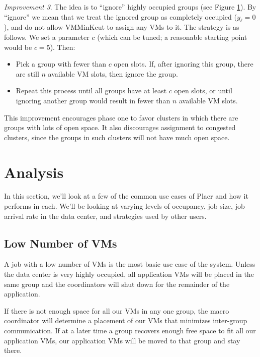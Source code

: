 \documentclass[11pt]{article}
\begin{document}
\begin{trivlist}
\begin{figure}
 \label{fig:improvements}

\end{figure}

\item \textit{Improvement 3}. The idea is to ``ignore'' highly occupied groups (see Figure \ref{fig:improvements}).  By ``ignore'' we mean that we treat the ignored group as completely occupied ($y_\ell = 0$), and do not allow VMMinKcut to assign any VMs to it.  The strategy is as follows.  We set a parameter $c$ (which can be tuned; a reasonable starting point would be $c=5$).  Then:

\begin{itemize}
  \item Pick a group with fewer than $c$ open slots.  If, after ignoring this group, there are still $n$ available VM slots, then ignore the group.
  \item Repeat this process until all groups have at least $c$ open slots, or until ignoring another group would result in fewer than $n$ available VM slots.
\end{itemize}

This improvement encourages phase one to favor clusters in which there are groups with lots of open space.  It also discourages assignment to congested clusters, since the groups in such clusters will not have much open space.

\end{trivlist}

\FloatBarrier
\section{Analysis}

In this section, we'll look at a few of the common use cases of Placr and how it performs in each.  We'll be looking at varying levels of occupancy, job size, job arrival rate in the data center, and strategies used by other users.

\subsection{Low Number of VMs}

A job with a low number of VMs is the most basic use case of the system.  Unless the data center is very highly occupied, all application VMs will be placed in the same group and the coordinators will shut down for the remainder of the application.

If there is not enough space for all our VMs in any one group, the macro coordinator will determine a placement of our VMs that minimizes inter-group communication.  If at a later time a group recovers enough free space to fit all our application VMs, our application VMs will be moved to that group and stay there.
\end{document}
